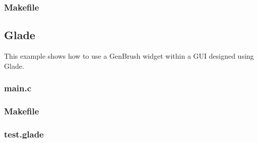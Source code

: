 \begin{scriptsize}
\begin{ttfamily}

\end{ttfamily}
\end{scriptsize}

\subsubsection{Makefile}

\begin{scriptsize}
\begin{ttfamily}

\end{ttfamily}
\end{scriptsize}

\subsection{Glade}

This example shows how to use a GenBrush widget within a GUI designed using Glade.

\subsubsection{main.c}

\begin{scriptsize}
\begin{ttfamily}

\end{ttfamily}
\end{scriptsize}

\subsubsection{Makefile}

\begin{scriptsize}
\begin{ttfamily}

\end{ttfamily}
\end{scriptsize}

\subsubsection{test.glade}

\begin{scriptsize}
\begin{ttfamily}

\end{ttfamily}
\end{scriptsize}
